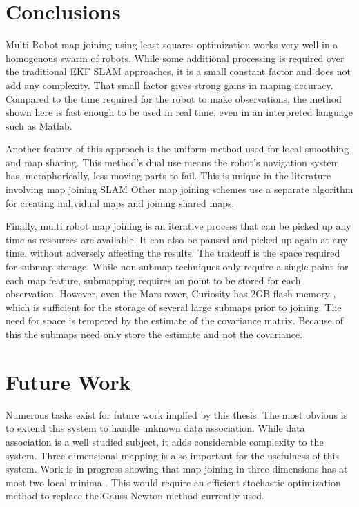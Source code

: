 \documentclass[12pt]{report}
\begin{document}
\chapter{Conclusions}

	Multi Robot map joining using least squares optimization works very well in a homogenous swarm of robots.  While some additional processing is required over the traditional EKF SLAM approaches, it is a small constant factor and does not add any complexity.  That small factor gives strong gains in maping accuracy.  Compared to the time required for the robot to make observations, the method shown here is fast enough to be used in real time, even in an interpreted language such as Matlab.
	
	Another feature of this approach is the uniform method used for local smoothing and map sharing.  This method's dual use means the robot's navigation system has, metaphorically, less moving parts to fail.  This is unique in the literature involving map joining SLAM \cite{slam}  Other map joining schemes use a separate algorithm for creating individual maps and joining shared maps. 
	
	Finally, multi robot map joining is an iterative process that can be picked up any time as resources are available.  It can also be paused and picked up again at any time, without adversely affecting the results.  The tradeoff is the space required for submap storage.  While non-submap techniques only require a single point for each map feature, submapping requires an point to be stored for each observation.  However, even the Mars rover, Curiosity has 2GB flash memory \cite{curiosity}, which is sufficient for the storage of several large submaps prior to joining.  The need for space is tempered by the estimate of the covariance matrix.  Because of this the submaps need only store the estimate and not the covariance.
	

\chapter{Future Work}

Numerous tasks exist for future work implied by this thesis.  The most obvious is to extend this system to handle unknown data association.  While data association is a well studied subject, it adds considerable complexity to the system.  Three dimensional mapping is also important for the usefulness of this system.  Work is in progress showing that map joining in three dimensions has at most two local minima \cite{huang_icra12_talk}.  This would require an efficient stochastic optimization method to replace the Gauss-Newton method currently used.  
\end{document}

